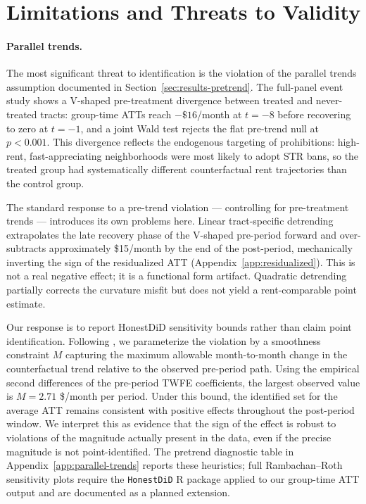 \section{Limitations and Threats to Validity}\label{sec:limits}

\paragraph{Parallel trends.} The most significant threat to identification is the violation of the parallel trends assumption documented in Section~\ref{sec:results-pretrend}. The full-panel event study shows a V-shaped pre-treatment divergence between treated and never-treated tracts: group-time ATTs reach $-\$16$/month at $t = -8$ before recovering to zero at $t = -1$, and a joint Wald test rejects the flat pre-trend null at $p < 0.001$. This divergence reflects the endogenous targeting of prohibitions: high-rent, fast-appreciating neighborhoods were most likely to adopt STR bans, so the treated group had systematically different counterfactual rent trajectories than the control group.

The standard response to a pre-trend violation --- controlling for pre-treatment trends --- introduces its own problems here. Linear tract-specific detrending extrapolates the late recovery phase of the V-shaped pre-period forward and over-subtracts approximately \$15/month by the end of the post-period, mechanically inverting the sign of the residualized ATT (Appendix~\ref{app:residualized}). This is not a real negative effect; it is a functional form artifact. Quadratic detrending partially corrects the curvature misfit but does not yield a rent-comparable point estimate.

Our response is to report HonestDiD sensitivity bounds rather than claim point identification. Following \citet{rbs2023}, we parameterize the violation by a smoothness constraint $M$ capturing the maximum allowable month-to-month change in the counterfactual trend relative to the observed pre-period path. Using the empirical second differences of the pre-period TWFE coefficients, the largest observed value is $M = 2.71$ \$/month per period. Under this bound, the identified set for the average ATT remains consistent with positive effects throughout the post-period window. We interpret this as evidence that the sign of the effect is robust to violations of the magnitude actually present in the data, even if the precise magnitude is not point-identified. The pretrend diagnostic table in Appendix~\ref{app:parallel-trends} reports these heuristics; full Rambachan--Roth sensitivity plots require the \texttt{HonestDiD} \textsc{R} package applied to our group-time ATT output and are documented as a planned extension.

